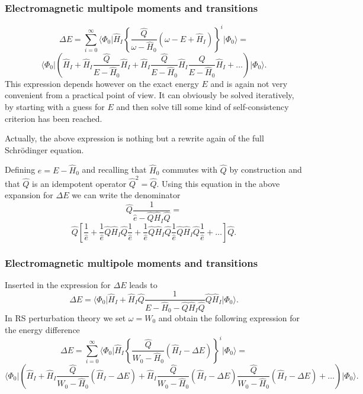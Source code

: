 \documentclass{beamer}
\begin{document}
\begin{frame}
\frametitle{Electromagnetic multipole moments and transitions}

\begin{block}{}
\[
\Delta E=\sum_{i=0}^{\infty}\langle \Phi_0\vert \hat{H}_I\left\{\frac{\hat{Q}}{\omega-\hat{H}_0}\left(\omega-E+\hat{H}_I\right)\right\}^i\vert \Phi_0\rangle=\]
\[
\langle \Phi_0\vert \left(\hat{H}_I+\hat{H}_I\frac{\hat{Q}}{E-\hat{H}_0}\hat{H}_I+
\hat{H}_I\frac{\hat{Q}}{E-\hat{H}_0}\hat{H}_I\frac{\hat{Q}}{E-\hat{H}_0}\hat{H}_I+\dots\right)\vert \Phi_0\rangle. 
\]
This expression depends however on the exact energy $E$ and is again not very convenient from a practical point of view. It can obviously be solved iteratively, by starting with a guess for  $E$ and then solve till some kind of self-consistency criterion has been reached. 

Actually, the above expression is nothing but a rewrite again of the full Schr\"odinger equation. 
\end{block}
Defining $e=E-\hat{H}_0$ and recalling that $\hat{H}_0$ commutes with 
$\hat{Q}$ by construction and that $\hat{Q}$ is an idempotent operator
$\hat{Q}^2=\hat{Q}$. 
Using this equation in the above expansion for $\Delta E$ we can write the denominator 
\[
\hat{Q}\frac{1}{\hat{e}-\hat{Q}\hat{H}_I\hat{Q}}=
\]
\[
\hat{Q}\left[\frac{1}{\hat{e}}+\frac{1}{\hat{e}}\hat{Q}\hat{H}_I\hat{Q}
\frac{1}{\hat{e}}+\frac{1}{\hat{e}}\hat{Q}\hat{H}_I\hat{Q}
\frac{1}{\hat{e}}\hat{Q}\hat{H}_I\hat{Q}\frac{1}{\hat{e}}+\dots\right]\hat{Q}.
\]
\end{frame}

\begin{frame}
\frametitle{Electromagnetic multipole moments and transitions}

\begin{block}{}
Inserted in the expression for $\Delta E$ leads to 
\[
\Delta E=
\langle \Phi_0\vert \hat{H}_I+\hat{H}_I\hat{Q}\frac{1}{E-\hat{H}_0-\hat{Q}\hat{H}_I\hat{Q}}\hat{Q}\hat{H}_I\vert \Phi_0\rangle. 
\]
In RS perturbation theory we set $\omega = W_0$ and obtain the following expression for the energy difference
\[
\Delta E=\sum_{i=0}^{\infty}\langle \Phi_0\vert \hat{H}_I\left\{\frac{\hat{Q}}{W_0-\hat{H}_0}\left(\hat{H}_I-\Delta E\right)\right\}^i\vert \Phi_0\rangle=
\]
\[
\langle \Phi_0\vert \left(\hat{H}_I+\hat{H}_I\frac{\hat{Q}}{W_0-\hat{H}_0}(\hat{H}_I-\Delta E)+
\hat{H}_I\frac{\hat{Q}}{W_0-\hat{H}_0}(\hat{H}_I-\Delta E)\frac{\hat{Q}}{W_0-\hat{H}_0}(\hat{H}_I-\Delta E)+\dots\right)\vert \Phi_0\rangle.
\]
\end{block}
\end{frame}
\end{document}
